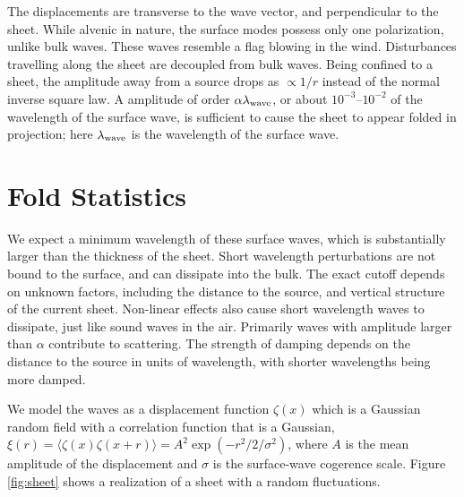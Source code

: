 \documentclass[useAMS,usenatbib]{mn2e}
\begin{document}
The displacements are
transverse to the wave vector, and perpendicular to the sheet.  While
alvenic in nature, the surface modes possess only one polarization,
unlike bulk waves.  These waves resemble a flag blowing in the wind.
Disturbances travelling along the sheet are decoupled from bulk waves.
Being confined to a sheet, the amplitude away from a source drops as
$\propto 1/r$ instead of the normal inverse square law.  A amplitude
of order $\alpha \lambda_{\rm wave}$,   or about $10^{-3}$--$10^{-2}$ of the wavelength
of the surface wave, is
sufficient to cause the sheet to appear folded in projection; here $\lambda_{\rm wave}$ is the wavelength of the surface wave.



\section{Fold Statistics}


We expect a minimum wavelength of these surface waves, which is
substantially larger than the thickness of the sheet.  Short
wavelength perturbations are not bound to the surface, and can
dissipate into the bulk.  The exact cutoff depends on unknown factors,
including the distance to the source, and vertical structure of the
current sheet.  Non-linear effects also cause short wavelength waves
to dissipate, just like sound waves in the air.  Primarily waves with
amplitude larger than $\alpha$ contribute to scattering.  The strength
of damping depends on the distance to the source in units of
wavelength, with shorter wavelengths being more damped.


We model the waves as a displacement function $\zeta(x)$
which is a Gaussian random field with a correlation function that is a
Gaussian, $\xi(r)=\langle \zeta(x)
\zeta(x+r)\rangle=A^2\exp(-r^2/2/\sigma^2)$, where $A$ is the mean amplitude
of the displacement and $\sigma$ is the surface-wave
cogerence scale.  Figure \ref{fig:sheet} shows a realization of a
sheet with a random fluctuations.
\end{document}
